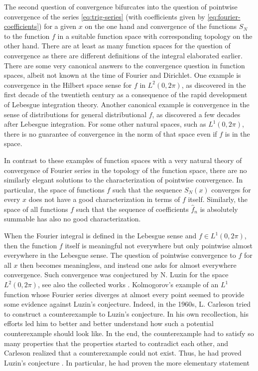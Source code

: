 The second question of convergence bifurcates into the question of pointwise
convergence of the series \eqref{eq:trig-series} (with coefficients given by
\eqref{eq:fourier-coefficients}) for a given $x$ on the one hand and
convergence of the functions $S_N$ to the function $f$ in a suitable function
space with corresponding topology on the other hand. There are at least as
many function spaces for the question of convergence as there are different
definitions of the integral elaborated earlier. There are some very canonical
answers to the convergence question in function spaces, albeit not known at
the time of Fourier and Dirichlet. One example is convergence in the Hilbert
space sense for $f$ in $L^2(0,2\pi)$, as discovered in the first decade of
the twentieth century as a consequence of the rapid development of Lebesgue
integration theory. Another canonical example is convergence in the sense of
distributions for general distributional $f$, as discovered a few decades
after Lebesgue integration. For some other natural spaces, such as
$L^1(0,2\pi)$, there is no guarantee of convergence in the norm of that space
even if $f$ is in the space.


In contrast to these examples of function spaces with a very natural theory
of convergence of Fourier series in the topology of the function space, there
are no similarly elegant solutions to the characterization of pointwise
convergence. In particular, the space of functions $f$ such that the sequence
$S_N(x)$ converges for every $x$ does not have a good characterization in
terms of $f$ itself. Similarly, the space of all functions $f$ such that the
sequence of coefficients $\widehat{f}_n$ is absolutely summable has also no
good characterization.

When the Fourier integral is defined in the Lebesgue sense and
$f\in L^1(0,2\pi)$, then the function
$f$ itself is meaningful not everywhere but only pointwise almost everywhere
in the Lebesgue sense. The question of pointwise convergence to $f$ for all $x$ then becomes
meaningless, and instead one asks for almost everywhere convergence.
Such convergence
was conjectured by N. Luzin \cite{Luzin13}
for the space
$L^2(0,2\pi)$, see also the collected works \cite{Luzin53}. Kolmogorov's example \cite{Kolmogorov} of an $L^1$ function whose Fourier series diverges at almost every point seemed to provide some evidence against Luzin's conjecture.
Indeed, in the 1960s, L. Carleson tried to construct a counterexample to Luzin's conjecture.
In his own recollection, his efforts led him to better and better understand how such a potential counterexample should look like.
In the end, the counterexample had to satisfy so many properties that the properties started to contradict each other,
and Carleson realized that a counterexample could not exist.
Thus, he had proved Luzin's conjecture \cite{carleson}.
In particular, he had proven the more elementary statement

